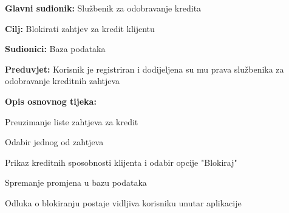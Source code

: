             
                \noindent {}
                \begin{packed_item}
                
                  \item \textbf{Glavni sudionik: } Službenik za odobravanje kredita
                  \item  \textbf{Cilj:} Blokirati zahtjev za kredit klijentu
                  \item  \textbf{Sudionici:} Baza podataka
                  \item  \textbf{Preduvjet:} Korisnik je registriran i dodijeljena su mu prava službenika za odobravanje kreditnih zahtjeva 
                  \item  \textbf{Opis osnovnog tijeka:}
                  
                  \item[] \begin{packed_enum}
                
                    \item Preuzimanje liste zahtjeva za kredit
                    \item Odabir jednog od zahtjeva 
                    \item Prikaz kreditnih sposobnosti klijenta i odabir opcije "Blokiraj"
                    \item Spremanje promjena u bazu podataka
                    \item Odluka o blokiranju postaje vidljiva korisniku unutar aplikacije
                    
                      \end{packed_enum}
                    \end{packed_item}
                
